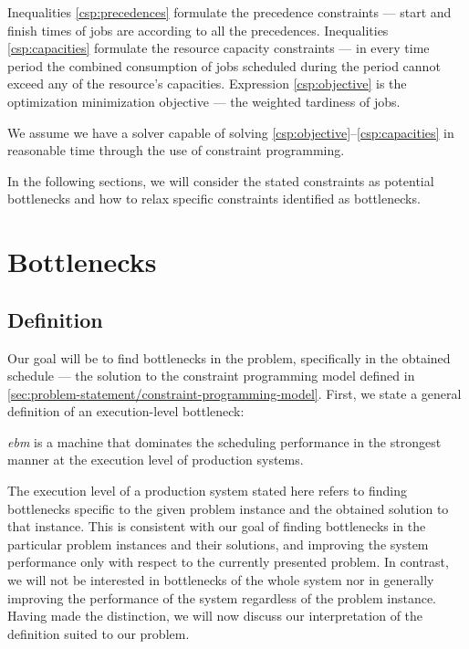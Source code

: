 Inequalities \eqref{csp:precedences} formulate the precedence constraints --- start and finish times of jobs
are according to all the precedences.
Inequalities \eqref{csp:capacities} formulate the resource capacity constraints --- in every time period
the combined consumption of jobs scheduled during the period cannot exceed any of the resource's capacities.
Expression \eqref{csp:objective} is the optimization minimization objective --- the weighted tardiness of jobs.

We assume we have a solver capable of solving \eqref{csp:objective}--\eqref{csp:capacities} in reasonable time
through the use of constraint programming.

In the following sections, we will consider the stated constraints as potential bottlenecks
and how to relax specific constraints identified as bottlenecks.

\section{Bottlenecks} \label{sec:problem-statement/bottlenecks}

\subsection{Definition} \label{subsec:problem-statement/bottlenecks/definition}

Our goal will be to find bottlenecks in the problem, specifically in the obtained schedule
--- the solution to the constraint programming model defined in \cref{sec:problem-statement/constraint-programming-model}.
First, we state a general definition of an execution-level bottleneck:

\begin{defn} \label{def:bottleneck}
    \emph{\ac{ebm}} is a machine that dominates the scheduling performance in the strongest manner
    at the execution level of production systems.
\end{defn}

The execution level of a production system stated here refers to finding bottlenecks
specific to the given problem instance and the obtained solution to that instance.
This is consistent with our goal of finding bottlenecks in the particular problem instances and their solutions,
and improving the system performance only with respect to the currently presented problem.
In contrast, we will not be interested in bottlenecks of the whole system
nor in generally improving the performance of the system regardless of the problem instance.
Having made the distinction, we will now discuss our interpretation of the definition suited to our problem.

